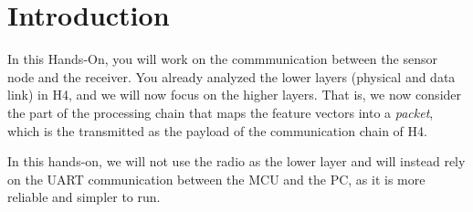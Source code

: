 \section*{Introduction}

In this Hands-On, you will work on the commmunication between the sensor node
and the receiver. You already analyzed the lower layers (physical and data
link) in H4, and we will now focus on the higher layers. That is, we now
consider the part of the processing chain that maps the feature vectors into a
\emph{packet}, which is the transmitted as the payload of the communication
chain of H4.

In this hands-on, we will not use the radio as the lower layer and will instead
rely on the UART communication between the MCU and the PC, as it is more
reliable and simpler to run.
